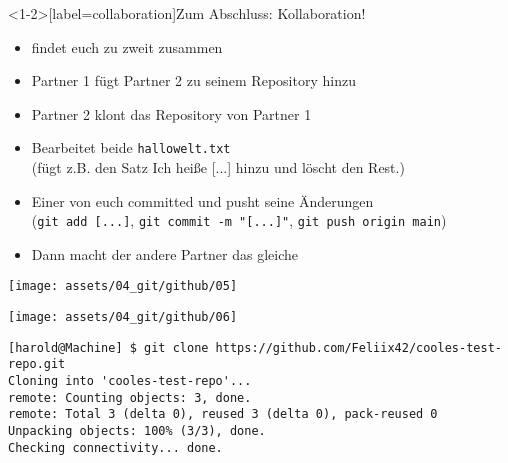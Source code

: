 \begin{frame}<1-2>[label=collaboration]{Zum Abschluss: Kollaboration!}
	\begin{itemize}
		\item<1-> findet euch zu zweit zusammen
		\item<2-> Partner 1 fügt Partner 2 zu seinem Repository hinzu
		\item<3-> Partner 2 klont das Repository von Partner 1
		\item<4-> Bearbeitet beide \texttt{hallowelt.txt} \\
			(fügt z.B. den Satz \glqq{}Ich heiße [...]\grqq{} hinzu und löscht den Rest.)
		\item<5-> Einer von euch committed und pusht seine Änderungen \\
			(\texttt{git add [...]}, \texttt{git commit -m "[...]"}, \texttt{git push origin main})
		\item<6-> Dann macht der andere Partner das gleiche
	\end{itemize}
\end{frame}

\begin{frame}
	\centering \texttt{[image: assets/04\_git/github/05]}
\end{frame}


\begin{frame}
	\centering \texttt{[image: assets/04\_git/github/06]}
\end{frame}

\begin{frame}[fragile]
	\begin{lstlisting}
[harold@Machine] $ git clone https://github.com/Feliix42/cooles-test-repo.git
Cloning into 'cooles-test-repo'...
remote: Counting objects: 3, done.
remote: Total 3 (delta 0), reused 3 (delta 0), pack-reused 0
Unpacking objects: 100% (3/3), done.
Checking connectivity... done.
\end{lstlisting}
\end{frame}


